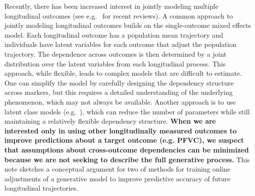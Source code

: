 \documentclass[12pt]{article}
\begin{document}
Recently, there has been increased interest in jointly modeling multiple longitudinal outcomes (see e.g.~\cite{Verbeke2014-cs,Fieuws2007-qo} for recent reviews). A common approach to jointly modeling longitudinal outcomes builds on the single-outcome mixed effects model. Each longitudinal outcome has a population mean trajectory and individuals have latent variables for each outcome that adjust the population trajectory. The dependence across outcomes is then determined by a joint distribution over the latent variables from each longitudinal process. This approach, while flexible, leads to complex models that are difficult to estimate. One can simplify the model by carefully designing the dependency structure across markers, but this requires a detailed understanding of the underlying phenomenon, which may not always be available. Another approach is to use latent class models (e.g.~\cite{Putter2008-gx}), which can reduce the number of parameters while still maintaining a relatively flexible dependency structure. \textbf{When we are interested only in using other longitudinally measured outcomes to improve predictions about a target outcome (e.g. PFVC), we suspect that assumptions about cross-outcome dependencies can be minimized because we are not seeking to describe the full generative process.} This note sketches a conceptual argument for two of methods for training online adjustments of a generative model to improve predictive accuracy of future longitudinal trajectories. 
\end{document}
